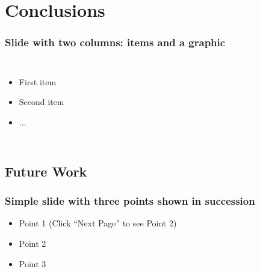 \documentclass[]{beamer}
\begin{document}
\section{Conclusions}

\begin{frame}
  \frametitle{Slide with two columns: items and a graphic}   %
  \begin{columns}[c]
  \column{2in}  %
  \begin{itemize}
  \item<1-> First item
  \item<2-> Second item
  \item<3-> ...
  \end{itemize}
  \column{2in}
  \end{columns}
\end{frame}

\subsection{Future Work}

\begin{frame}
  \frametitle{Simple slide with three points shown in succession}   %

  \begin{itemize}
  \item<1-> Point 1 (Click ``Next Page'' to see Point 2) %
  \item<2-> Point 2  %
  \item<3-> Point 3
  \end{itemize}
\end{frame}
\end{document}
